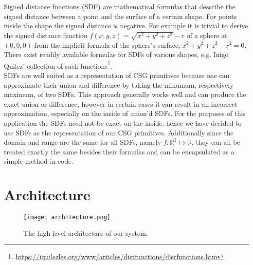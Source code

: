Signed distance functions (SDF) are mathematical formulas that describe the signed distance between a point and the surface of a certain shape. For points inside the shape the
signed distance is negative. For example it is trivial to derive the signed distance function $f(x,y,z) = \sqrt{x^2 + y^2 + z^2} - r$ of a sphere at $(0, 0, 0)$ from the implicit formula of the sphere's surface, $x^2 + y^2 + z^2 - r^2 = 0$. There exist readily available formulas for SDFs of various shapes, e.g. Inigo Quilez' collection of such functions\footnote{\url{https://iquilezles.org/www/articles/distfunctions/distfunctions.htm}}.\\
SDFs are well suited as a representation of CSG primitives because one can approximate their union and difference by taking the minumum, respectively maximum, of two SDFs. This approach generally works
well and can produce the exact union or difference, however in certain cases it can result in an incorrect approximation, especially on the inside of union'd SDFs. For the purposes of this application the
SDFs need not be exact on the inside, hence we have decided to use SDFs as the representation of our CSG primitives. Additionally since the domain and range are the same for all SDFs, namely
$f\colon \mathbb{R}^3 \mapsto \mathbb{R}$, they can all be treated exactly the same besides their formulas and can be encapsulated as a simple method in code.


\section{Architecture}

\begin{figure}
\centering
\captionsetup{width=0.8\textwidth}
\texttt{[image: architecture.png]}
\caption{The high level architecture of our system.}
\label{fig:architecture}
\end{figure}

